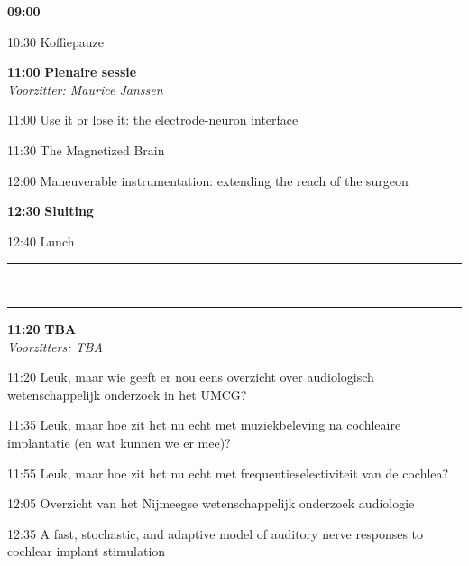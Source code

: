 \documentclass[a4paper,10pt]{report}
\begin{document}
\begin{multicols*}{3}
\columnbreak


\begin{packed_enum}
\item[{\color{Blue} {\textbf{09:00} }}]{ }
        \vfill
\item[10:30] Koffiepauze
        \vfill
\item[\textbf{11:00}] {\textbf{Plenaire sessie}}\\\textit{Voorzitter: Maurice Janssen}
\item[11:00] Use it or lose it: the electrode-neuron interface
\item[11:30] The Magnetized Brain
\item[12:00] Maneuverable instrumentation: extending the reach of the surgeon
        \vfill
\item[\textbf{12:30}] \textbf{Sluiting}
\item[12:40] Lunch
\end{packed_enum}%

\hrule %
\\
\hrule
\vfill

\begin{packed_enum}
\item[\textbf{11:20}] {\textbf{TBA}}\\\textit{Voorzitters: TBA}
\item[11:20] Leuk, maar wie geeft er nou eens overzicht over audiologisch wetenschappelijk onderzoek in het UMCG?
\item[11:35] Leuk, maar hoe zit het nu echt met muziekbeleving na cochleaire implantatie (en wat kunnen we er mee)?
\item[11:55] Leuk, maar hoe zit het nu echt met frequentieselectiviteit van de cochlea?
\item[12:05] Overzicht van het Nijmeegse wetenschappelijk onderzoek audiologie
\item[12:35] A fast, stochastic, and adaptive model of auditory nerve responses to cochlear implant stimulation
\end{packed_enum} %


\end{multicols*}
\end{document}
